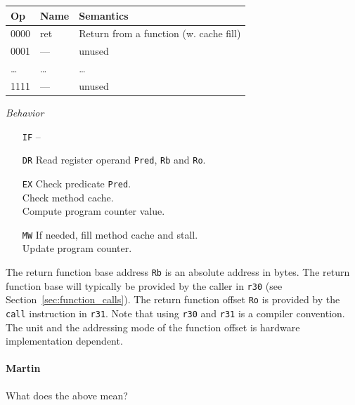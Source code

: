 \documentclass{IEEEtran}
\newcommand{\comment}[3]{\paragraph*{\textbf{#1}}{\color{#3}#2}}
\newcommand{\martin}[1]{\comment{Martin}{#1}{Blue}}
\begin{document}
\begin{tabular}{lll}
  Op & Name  & Semantics \\ \hline
  0000 & ret   & Return from a function (w. cache fill) \\
  0001 & ---   & unused \\
  \dots& \dots  & \dots \\
  1111 & ---   & unused \\ \hline
\end{tabular}

\vspace{7mm}
\emph{Behavior}

\begin{itemize}
  \item[\texttt{IF}] --
  \item[\texttt{DR}] Read register operand \texttt{Pred}, \texttt{Rb} and
                     \texttt{Ro}.
  \item[\texttt{EX}] Check predicate \texttt{Pred}. \\
                     Check method cache. \\
                     Compute program counter value.
  \item[\texttt{MW}] If needed, fill method cache and stall. \\
                     Update program counter.
\end{itemize}

The return function base address \texttt{Rb} is an absolute address in bytes. The return function base will typically
be provided by the caller in \texttt{r30} (see Section~\ref{sec:function_calls}). 
The return function offset \texttt{Ro} is provided by the \texttt{call} instruction in \texttt{r31}.
Note that using \texttt{r30} and \texttt{r31} is a compiler convention.
The unit and the addressing mode
of the function offset is hardware implementation dependent.
\martin{What does the above mean?}
\end{document}
